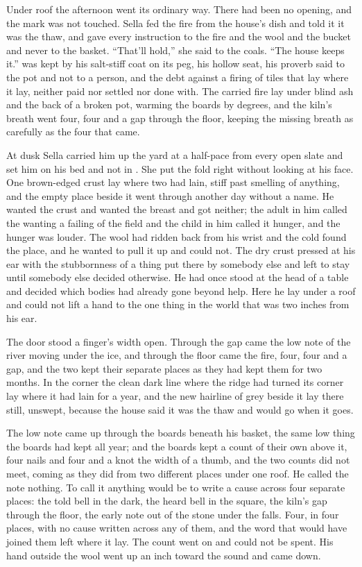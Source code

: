 Under  roof the afternoon went its ordinary way. There had been no opening, and the mark was not touched. Sella fed the fire from the house's dish and told it it was the thaw, and gave every instruction to the fire and the wool and the bucket and never to the basket. “That'll hold,” she said to the coals. “The house keeps it.”  was kept by his salt-stiff coat on its peg, his hollow seat, his proverb said to the pot and not to a person, and the debt against a firing of tiles that lay where it lay, neither paid nor settled nor done with. The carried fire lay under blind ash and the back of a broken pot, warming the boards by degrees, and the kiln's breath went four, four and a gap through the floor, keeping the missing breath as carefully as the four that came.

\scenebreak

At dusk Sella carried him up the yard at a half-pace from every open slate and set him on his bed and not in . She put the fold right without looking at his face. One brown-edged crust lay where two had lain, stiff past smelling of anything, and the empty place beside it went through another day without a name. He wanted the crust and wanted the breast and got neither; the adult in him called the wanting a failing of the field and the child in him called it hunger, and the hunger was louder. The wool had ridden back from his wrist and the cold found the place, and he wanted to pull it up and could not. The dry crust pressed at his ear with the stubbornness of a thing put there by somebody else and left to stay until somebody else decided otherwise. He had once stood at the head of a table and decided which bodies had already gone beyond help. Here he lay under a roof and could not lift a hand to the one thing in the world that was two inches from his ear.

The door stood a finger's width open. Through the gap came the low note of the river moving under the ice, and through the floor came the fire, four, four and a gap, and the two kept their separate places as they had kept them for two months. In the corner the clean dark line where the  ridge had turned its corner lay where it had lain for a year, and the new hairline of grey beside it lay there still, unswept, because the house said it was the thaw and would go when it goes.

The low note came up through the boards beneath his basket, the same low thing the boards had kept all year; and the boards kept a count of their own above it, four nails and four and a knot the width of a thumb, and the two counts did not meet, coming as they did from two different places under one roof. He called the note nothing. To call it anything would be to write a cause across four separate places: the told bell in the dark, the heard bell in the square, the kiln's gap through the floor, the early note out of the stone under the falls. Four, in four places, with no cause written across any of them, and the word that would have joined them left where it lay. The count went on and could not be spent. His hand outside the wool went up an inch toward the sound and came down.

